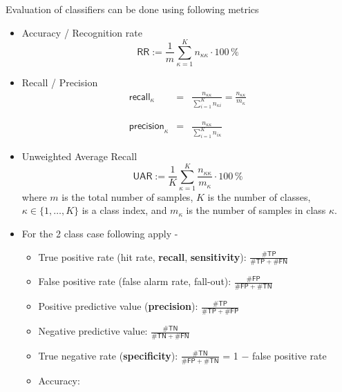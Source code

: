 \documentclass{article}
\begin{document}
Evaluation of classifiers can be done using following metrics
\begin{itemize}
    \item Accuracy / Recognition rate
     \small
              \begin{displaymath}
                 \mathsf{RR} := \frac{1}{m} \sum_{\kappa=1}^{K}n_{\kappa\kappa} \cdot 100\,\%
              \end{displaymath}
    \item Recall / Precision
    \small
              \begin{eqnarray*}
                 \mathsf{recall}_\kappa    & = & \frac{n_{\kappa\kappa}}{\sum_{i=1}^K n_{\kappa i}}
                 = \frac{n_{\kappa\kappa}}{m_\kappa} \\
                 \\
                 \\
                 \mathsf{precision}_\kappa & = & \frac{n_{\kappa\kappa}}{\sum_{i=1}^K n_{i \kappa}}
              \end{eqnarray*}
    \item Unweighted Average Recall
    \small
              \begin{displaymath}
                 \mathsf{UAR} := \frac{1}{K} \sum_{\kappa=1}^K \frac{n_{\kappa\kappa}}{m_\kappa} \cdot 100\,\%
              \end{displaymath}
              where $m$ is the total number of samples, $K$ is the number of classes, $\kappa\in\{1,\dots,K\}$ is a class index, and $m_\kappa$ is the number of samples in class $\kappa$.
    \item For the 2 class case following apply -
    \begin{itemize}
        \item True positive rate (hit rate, \textbf{recall}, \textbf{sensitivity}): $\frac{\#\mathsf{TP}}{\#\mathsf{TP} + \#\mathsf{FN}}$
      \item False positive rate (false alarm rate, fall-out): $\frac{\#\mathsf{FP}}{\#\mathsf{FP} + \#\mathsf{TN}}$
      \item Positive predictive value (\textbf{precision}): $\frac{\#\mathsf{TP}}{\#\mathsf{TP} + \#\mathsf{FP}}$
      \item Negative predictive value: $\frac{\#\mathsf{TN}}{\#\mathsf{TN} + \#\mathsf{FN}}$
      \item True negative rate (\textbf{specificity}): $\frac{\#\mathsf{TN}}{\#\mathsf{FP} + \#\mathsf{TN}}$ = 1 $-$ false positive rate
       \item Accuracy:

\end{itemize}
\end{itemize}
\end{document}
